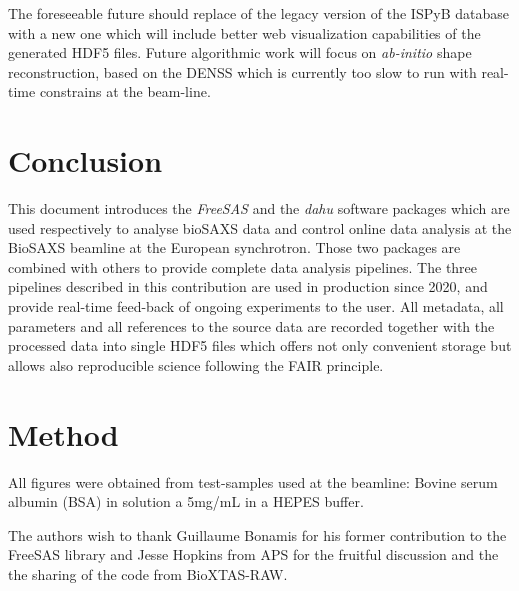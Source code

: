 \documentclass[preprint]{iucr}              %
\begin{document}
The foreseeable future should replace of the legacy version of the ISPyB database with a new one which will include better web visualization capabilities of the generated HDF5 files.
Future algorithmic work will focus on \textit{ab-initio} shape reconstruction, based on the DENSS \cite{denss} which is currently too slow to run with real-time constrains at the beam-line.

\section{Conclusion}

This document introduces the \textit{FreeSAS} and the \textit{dahu} software packages which are used respectively to analyse bioSAXS data 
and control online data analysis at the BioSAXS beamline at the European synchrotron. 
Those two packages are combined with others to provide complete data analysis pipelines.
The three pipelines described in this contribution are used in production since 2020, and provide real-time feed-back of ongoing experiments to the user.
All metadata, all parameters and all references to the source data are recorded together with the processed data into single HDF5 files which offers 
not only convenient storage but allows also reproducible science following the FAIR principle. 

\appendix
\section{Method}

All figures were obtained from test-samples used at the beamline: Bovine serum albumin (BSA) in solution a 5mg/mL in a HEPES buffer.

The authors wish to thank Guillaume Bonamis for his former contribution to the FreeSAS library and Jesse Hopkins from APS for the fruitful discussion and the the sharing of the code from BioXTAS-RAW.




\end{document}

